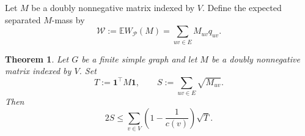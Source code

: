 \documentclass[11pt]{article}
\numberwithin{equation}{section}
\newtheorem{theorem}{Theorem}[section]
\theoremstyle{definition}
\theoremstyle{remark}
\newcommand{\one}{\mathbf 1}
\newcommand{\E}{\mathbb E}
\begin{document}
	Let $M$ be a doubly nonnegative matrix indexed by $V$. Define the expected separated $M$-mass by
	\begin{equation}\label{eq:Wbar-def}
		\mathcal W
		:=
		\E W_{\mathcal P}(M)
		=
		\sum_{uv\in E}M_{uv}q_{uv}.
	\end{equation}
	\begin{theorem}
		\label{thm:localized-DNN}
		Let $G$ be a finite simple graph and let $M$ be a doubly nonnegative
		matrix indexed by $V$.  Set
		\[
		T:=\one^{\top}M\one,
		\qquad
		S:=\sum_{uv\in E}\sqrt{M_{uv}}.
		\]
		Then
		\begin{equation}\label{eq:localized-DNN}
			2S\leq \sum_{v\in V}\left(1-\frac1{c(v)}\right)\sqrt{T}.
		\end{equation}
	\end{theorem}
	
\end{document}

